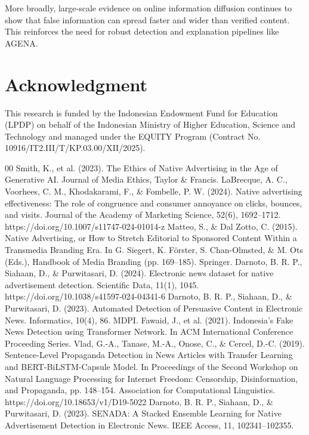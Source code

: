 \documentclass{ieeeaccess}
\begin{document}
More broadly, large-scale evidence on online information diffusion continues to show that false information can spread faster and wider than verified content. This reinforces the need for robust detection and explanation pipelines like AGENA.

\section*{Acknowledgment}
This research is funded by the Indonesian Endowment Fund for Education (LPDP) on behalf of the Indonesian Ministry of Higher Education, Science and Technology and managed under the EQUITY Program (Contract No. 10916/IT2.III/T/KP.03.00/XII/2025).

\begin{thebibliography}{00}
 Smith, K., et al. (2023). The Ethics of Native Advertising in the Age of Generative AI. Journal of Media Ethics, Taylor \& Francis.
 LaBrecque, A. C., Voorhees, C. M., Khodakarami, F., \& Fombelle, P. W. (2024). Native advertising effectiveness: The role of congruence and consumer annoyance on clicks, bounces, and visits. Journal of the Academy of Marketing Science, 52(6), 1692--1712. https://doi.org/10.1007/s11747-024-01014-z
 Matteo, S., \& Dal Zotto, C. (2015). Native Advertising, or How to Stretch Editorial to Sponsored Content Within a Transmedia Branding Era. In G. Siegert, K. Förster, S. Chan-Olmsted, \& M. Ots (Eds.), Handbook of Media Branding (pp. 169--185). Springer.
 Darnoto, B. R. P., Siahaan, D., \& Purwitasari, D. (2024). Electronic news dataset for native advertisement detection. Scientific Data, 11(1), 1045. https://doi.org/10.1038/s41597-024-04341-6
 Darnoto, B. R. P., Siahaan, D., \& Purwitasari, D. (2023). Automated Detection of Persuasive Content in Electronic News. Informatics, 10(4), 86. MDPI.
 Fawaid, J., et al. (2021). Indonesia’s Fake News Detection using Transformer Network. In ACM International Conference Proceeding Series.
 Vlad, G.-A., Tanase, M.-A., Onose, C., \& Cercel, D.-C. (2019). Sentence-Level Propaganda Detection in News Articles with Transfer Learning and BERT-BiLSTM-Capsule Model. In Proceedings of the Second Workshop on Natural Language Processing for Internet Freedom: Censorship, Disinformation, and Propaganda, pp. 148--154. Association for Computational Linguistics. https://doi.org/10.18653/v1/D19-5022
 Darnoto, B. R. P., Siahaan, D., \& Purwitasari, D. (2023). SENADA: A Stacked Ensemble Learning for Native Advertisement Detection in Electronic News. IEEE Access, 11, 102341--102355.

\end{thebibliography}
\end{document}
